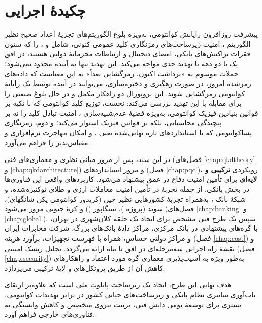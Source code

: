 \chapter*{چکیدهٔ اجرایی}

پیشرفت روزافزون رایانش کوانتومی، به‌ویژه بلوغ الگوریتم‌های تجزیهٔ اعداد صحیح نظیر الگوریتم ، امنیت زیرساخت‌های رمزنگاری کلید عمومی کنونی، شامل  و ، را که ستون فقرات تراکنش‌های بانکی، امضای دیجیتال و ارتباطات محرمانهٔ دولتی هستند، در افق یک تا دو دهه با تهدید جدی مواجه می‌کند. این تهدید تنها به آینده محدود نمی‌شود؛ حملات موسوم به «برداشت اکنون، رمزگشایی بعداً»  به این معناست که داده‌های رمزشدهٔ امروز، در صورت رهگیری و ذخیره‌سازی، می‌توانند در آینده توسط یک رایانهٔ کوانتومی رمزگشایی شوند. این پروپوزال دو راهکار مکمل و در حال بلوغ صنعتی را برای مقابله با این تهدید بررسی می‌کند: نخست، توزیع کلید کوانتومی  که با تکیه بر قوانین بنیادین فیزیک کوانتومی، به‌ویژه قضیهٔ عدم‌شبیه‌سازی ، امنیت تبادل کلید را نه بر پیچیدگی محاسباتی، بلکه بر قوانین فیزیک استوار می‌کند؛ و دوم، رمزنگاری پساکوانتومی  که با استانداردهای تازه نهایی‌شدهٔ  یعنی ،  و   امکان مهاجرت نرم‌افزاری و مقیاس‌پذیر را فراهم می‌آورد.

در این سند، پس از مرور مبانی نظری و معماری‌های فنی  (فصل‌های \ref{chap:qkdtheory} و \ref{chap:qkdarchitecture}) و مرور استانداردهای  (فصل \ref{chap:pqc})، رویکردی \textbf{ترکیبی و لایه‌ای}  برای تأمین امنیت دفاع در عمق پیشنهاد می‌شود. کاربردهای واقعی این فناوری‌ها در بخش بانکی، از جمله تجربهٔ  در تأمین امنیت معاملات ارزی و طلای توکنیزه‌شده، و شبکهٔ  بانک ، به‌همراه تجربهٔ کشورهایی نظیر چین (کریدور کوانتومی پکن-شانگهای)، سوئد (پروژهٔ )، سنگاپور () و کرهٔ جنوبی مرور می‌شود (فصل‌های \ref{chap:banking} و \ref{chap:global}). سپس یک طرح فنی مشخص برای ایجاد یک حلقهٔ کلان‌شهری  در تهران، با گره‌های پیشنهادی در بانک مرکزی، مراکز دادهٔ بانک‌های بزرگ، شرکت مخابرات ایران و مراکز دولتی حساس، همراه با فهرست تجهیزات، برآورد هزینه (فصل \ref{chap:cost}) و نقشهٔ راه اجرایی سه‌مرحله‌ای در افق  تا  ماه ارائه می‌گردد. تحلیل ریسک امنیتی (فصل \ref{chap:security}) به‌طور ویژه به آسیب‌پذیری معماری گره مورد اعتماد  و راهکارهای کاهش آن از طریق پروتکل‌های  و لایهٔ ترکیبی  می‌پردازد.

هدف نهایی این طرح، ایجاد یک زیرساخت پایلوت ملی است که علاوه‌بر ارتقای تاب‌آوری سایبری نظام بانکی و زیرساخت‌های حیاتی کشور در برابر تهدیدات کوانتومی، بستری برای توسعهٔ بومی دانش فنی، تربیت نیروی متخصص و کاهش وابستگی به فناوری‌های خارجی فراهم آورد.

